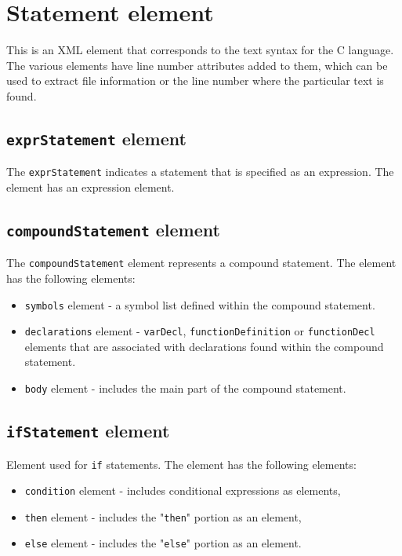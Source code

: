 \section{Statement element}

This is an XML element that corresponds to the text syntax for the C language. The various elements have line number attributes added to them, which can be used to extract file information or the line number where the particular text is found.


\subsection{ {\tt exprStatement} element}

The {\tt exprStatement} indicates a statement that is specified as an expression. The element has an expression element.


\subsection{ {\tt compoundStatement} element}

The {\tt compoundStatement} element represents a compound statement. The element has the following elements:

\begin{itemize}
\item {\tt symbols} element - a symbol list defined within the compound statement.
\item {\tt declarations} element - {\tt varDecl}, {\tt functionDefinition} or {\tt functionDecl} elements that are associated with declarations found within the compound statement.
\item {\tt body} element - includes the main part of the compound statement.
\end{itemize}


\subsection{ {\tt ifStatement} element}

Element used for {\tt if} statements. The element has the following elements:

\begin{itemize}
\item {\tt condition} element - includes conditional expressions as elements,
\item {\tt then} element - includes the "{\tt then}" portion as an element,
\item {\tt else} element - includes the "{\tt else}" portion as an element.
\end{itemize}


